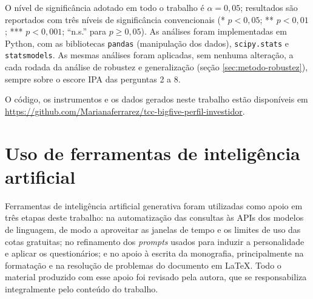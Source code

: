 O nível de significância adotado em todo o trabalho é $\alpha=0{,}05$;
resultados são reportados com três níveis de significância convencionais
(* $p<0{,}05$; ** $p<0{,}01$; *** $p<0{,}001$; ``n.s.'' para $p \geq 0{,}05$). As
análises foram implementadas em Python, com as bibliotecas
\texttt{pandas} (manipulação dos dados), \texttt{scipy.stats}
e \texttt{statsmodels}. As mesmas
análises foram aplicadas, sem nenhuma alteração, a cada rodada da análise
de robustez e generalização (seção \ref{sec:metodo-robustez}), sempre
sobre o escore IPA das perguntas 2 a 8.

O código, os instrumentos e os dados gerados neste trabalho estão
disponíveis em
\url{https://github.com/Marianaferrarez/tcc-bigfive-perfil-investidor}.

\section{Uso de ferramentas de inteligência artificial}
\label{sec:uso-ia}

Ferramentas de inteligência artificial generativa foram utilizadas como
apoio em três etapas deste trabalho: na automatização das consultas às
APIs dos modelos de linguagem, de modo a aproveitar as janelas de tempo e
os limites de uso das cotas gratuitas; no refinamento dos \textit{prompts}
usados para induzir a personalidade e aplicar os questionários; e no apoio
à escrita da monografia, principalmente na formatação e na resolução de
problemas do documento em \LaTeX. Todo o
material produzido com esse apoio foi revisado pela autora, que se
responsabiliza integralmente pelo conteúdo do trabalho.
